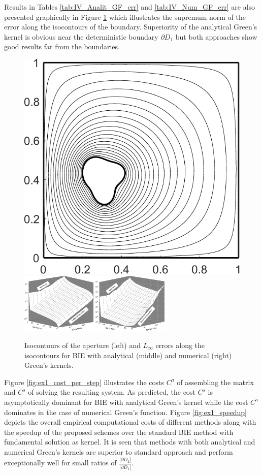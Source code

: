 Results in Tables \ref{tab:IV_Analit_GF_err} and \ref{tab:IV_Num_GF_err} are also presented graphically in Figure \ref{fig:ex1_isol_conv} which illustrates the supremum norm of the error along the isocontours of the boundary.
Superiority of the analytical Green's kernel is obvious near the deterministic boundary $\partial D_1$ but both approaches show good results far from the boundaries.


\begin{figure}[!t]
	\centering
    \includegraphics[width=0.25\linewidth]{IV_ex1_isolines}
    \;
    \includegraphics[width=0.32\textwidth]{IV_ex1_anGF_isolines}
    \;
    \includegraphics[width=0.32\textwidth]{IV_ex1_numGF_isolines}
	\caption[Maximum errors of the spatial approximation]{ Isocontours of the aperture (left) and $L_{\infty}$ errors along the isocontours for BIE with analytical (middle) and numerical (right) Green's kernels. }
	\label{fig:ex1_isol_conv}
\end{figure}


Figure \ref{fig:ex1_cost_per_step} illustrates the costs $C^a$ of assembling the matrix and $C^s$ of solving the resulting system.
As predicted, the cost $C^s$ is asymptotically dominant for BIE with analytical Green's kernel while the cost $C^a$ dominates in the case of numerical Green's function.
Figure \ref{fig:ex1_speedup} depicts the overall empirical computational costs of different methods along with the speedup of the proposed schemes over the standard BIE method with fundamental solution as kernel.
It is seen that methods with both analytical and numerical Green's kernels are superior to standard approach and perform exceptionally well for small ratios of $\frac{|\partial D_2|}{|\partial D_1|}$.



